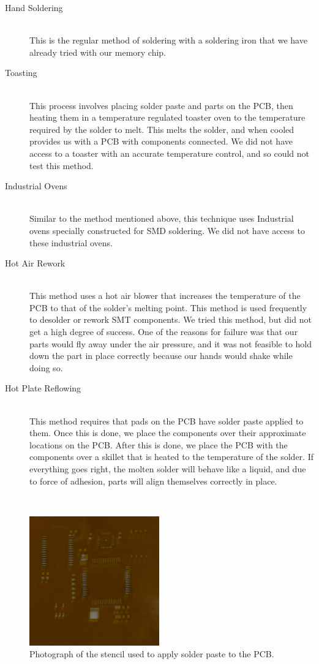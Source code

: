 \begin{description}

	\item[Hand Soldering] \hfill \\
	This is the regular method of soldering with a soldering iron that we have already tried with our memory chip.
	\item[Toasting] \hfill \\
	This process involves placing solder paste and parts on the PCB,
	then heating them in a temperature regulated toaster oven to the temperature required by the solder to melt.
	This melts the solder, and when cooled provides us with a PCB with components connected.
	We did not have access to a toaster with an accurate temperature control,
	and so could not test this method.
	\item[Industrial Ovens] \hfill \\
	Similar to the method mentioned above,
	this technique uses Industrial ovens specially constructed for SMD soldering.
	We did not have access to these industrial ovens.
	\item[Hot Air Rework] \hfill \\
	This method uses a hot air blower that increases the temperature of the PCB to that of the solder's melting point.
	This method is used frequently to desolder or rework SMT components.
	We tried this method,
	but did not get a high degree of success.
	One of the reasons for failure was that our parts would fly away under the air pressure,
	and it was not feasible to hold down the part in place correctly because our hands would shake while doing so.
	\item[Hot Plate Reflowing] \hfill \\
	This method requires that pads on the PCB have solder paste applied to them.
	Once this is done,
	we place the components over their approximate locations on the PCB.
	After this is done,
	we place the PCB with the components over a skillet that is heated to the temperature of the solder.
	If everything goes right,
	the molten solder will behave like a liquid,
	and due to force of adhesion,
	parts will align themselves correctly in place.
\end{description}
\hfill \\
\begin{figure}
\begin{center}
\includegraphics[width=0.5\textwidth]{images/stencil.jpg}
\caption{Photograph of the stencil used to apply solder paste to the PCB.}
\label{Fig:Stencil}
\end{center}
\end{figure}
